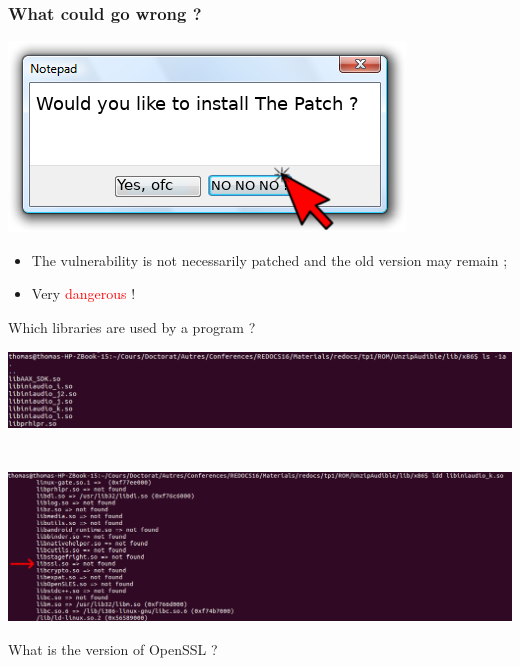 \documentclass[11pt]{beamer}
\begin{document}
\begin{frame}
    \frametitle{What could go wrong ?}
    \begin{center}
    \includegraphics[scale=0.5]{box.png}
    \end{center}

    \begin{block}{}
    \begin{itemize}
        \item The vulnerability is not necessarily patched and the old version may remain ;
        \item \Huge Very \textcolor{red}{dangerous} !
    \end{itemize}
    \end{block}

    \end{frame}
    
    \begin{frame}{Which libraries are used by a program ?}
    
    	\includegraphics[scale=0.27]{s1.png}
    	~\\
    	~\\
    	\includegraphics[scale=0.27]{s2.png}
    	
    	What is the version of OpenSSL ?
    \end{frame}
    
\end{document}
